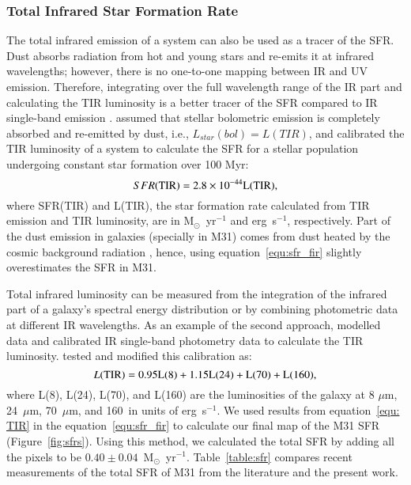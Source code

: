 \subsubsection{Total Infrared Star Formation Rate}
\label{sec:sfr_fir}
The total infrared emission of a system can also be used as a tracer of the SFR. Dust absorbs radiation from hot and young stars and re-emits it at infrared wavelengths; however, there is no one-to-one mapping between IR and UV emission. Therefore, integrating over the full wavelength range of the IR part and calculating the TIR luminosity is a better tracer of the SFR compared to IR single-band emission \citep{Calzetti13}. \citet{Calzetti13} assumed that stellar bolometric emission is completely absorbed and re-emitted by dust, i.e., $L_{star}(bol) = L(TIR)$, and calibrated the TIR luminosity of a system to calculate the SFR for a stellar population undergoing constant star formation over 100 Myr:
\begin{equation}
\label{equ:sfr_fir}
SFR(\rm TIR) = 2.8 \times10^{-44}L(\rm TIR),
\end{equation}
\noindent where SFR(TIR) and L(TIR), the star formation rate calculated from TIR emission and TIR luminosity, are in M$_{\odot}$~yr$^{-1}$ and erg~s$^{-1}$, respectively. Part of the dust emission in galaxies (specially in M31) comes from dust heated by the cosmic background radiation \citep[e.g.][]{Dole06, Calzetti13, Mattsson14}, hence, using equation~\ref{equ:sfr_fir} slightly overestimates the SFR in M31.  

Total infrared luminosity can be measured from the integration of the infrared part of a galaxy's spectral energy distribution or by combining photometric data at different IR wavelengths. As an example of the second approach, \citet{Draine07} modelled \Spitzer data and calibrated IR single-band photometry data to calculate the TIR luminosity. \citet{Boquien10} tested and modified this calibration as:
\begin{equation}
 \label{equ: TIR}
L(\rm TIR) = 0.95L(8) + 1.15L(24) + L(70) + L(160),
\end{equation}
\noindent where L(8), L(24), L(70), and L(160) are the luminosities of the galaxy at 8 $\mu$m, 24~$\mu$m, 70~$\mu$m, and 160~\um in units of erg~s$^{-1}$. We used results from equation~\ref{equ: TIR} in the equation~\ref{equ:sfr_fir} to calculate our final map of the M31 SFR (Figure~\ref{fig:sfrs}). Using this method, we calculated the total SFR by adding all the pixels to be $0.40 \pm 0.04$~M$_{\odot}$~yr$^{-1}$. Table~\ref{table:sfr} compares recent measurements of the total SFR of M31 from the literature and the present work. 


